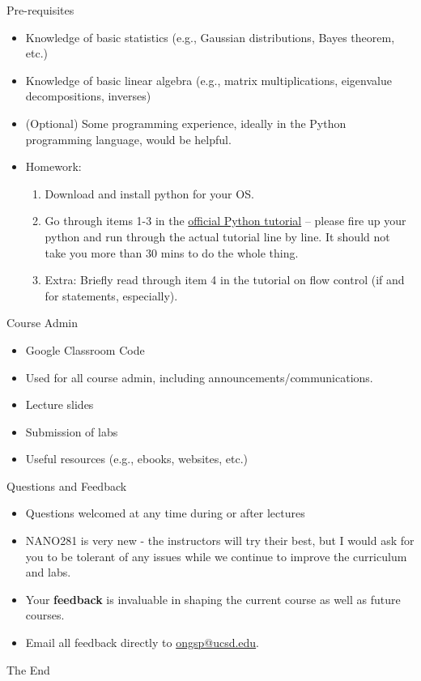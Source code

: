 \documentclass[aspectratio=169]{beamer}
\begin{document}
\begin{frame}{Pre-requisites}
    \begin{itemize}
        \item Knowledge of basic statistics (e.g., Gaussian distributions, Bayes theorem, etc.)
        \item Knowledge of basic linear algebra (e.g., matrix multiplications, eigenvalue decompositions, inverses)
        \item (Optional) Some programming experience, ideally in the Python programming language, would be helpful.
        \item Homework:
        \begin{enumerate}
            \item Download and install python for your OS.
            \item Go through items 1-3 in the \href{http://docs.python.org/3/tutorial/}{official Python tutorial} – please fire up your python and run through the actual tutorial line by line. It should not take you more than 30 mins to do the whole thing.
            \item Extra: Briefly read through item 4 in the tutorial on flow control (if and for statements, especially).
        \end{enumerate}
    \end{itemize}
\end{frame}

\begin{frame}{Course Admin}
    \begin{itemize}
        \item Google Classroom Code
        \item Used for all course admin, including announcements/communications.
        \item Lecture slides
        \item Submission of labs
        \item Useful resources (e.g., ebooks, websites, etc.)
    \end{itemize}
\end{frame}


\begin{frame}{Questions and Feedback}
    \begin{itemize}
        \item Questions welcomed at any time during or after lectures
        \item NANO281 is very new - the instructors will try their best, but I would ask for you to be tolerant of any issues while we continue to improve the curriculum and labs.
        \item Your \textbf{feedback} is invaluable in shaping the current course as well as future courses. 
        \item Email all feedback directly to \href{mailto:ongsp@eng.ucsd.edu}{ongsp@ucsd.edu}.
    \end{itemize}
\end{frame}


\begin{frame}
    \Huge{\centerline{The End}}
\end{frame}
\end{document}
